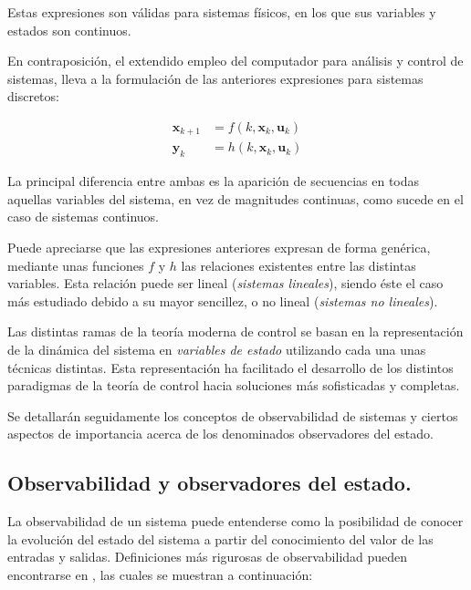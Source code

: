 Estas expresiones son válidas para sistemas físicos, en los que sus variables y estados son continuos. \par 

En contraposición, el extendido empleo del computador para análisis y control de sistemas, lleva a la formulación de las anteriores expresiones para sistemas discretos: 

\begin{subequations}
\begin{align}
	\boldsymbol{x}_{k+1} &= f(k,\boldsymbol{x}_k,\boldsymbol{u}_k) \\
	\boldsymbol{y}_k &= h(k,\boldsymbol{x}_k,\boldsymbol{u}_k)
\end{align}
\end{subequations}

La principal diferencia entre ambas es la aparición de secuencias en todas aquellas variables del sistema, en vez de magnitudes continuas, como sucede en el caso de sistemas continuos. \par 

Puede apreciarse que las expresiones anteriores expresan de forma genérica, mediante unas funciones $f$ y $h$ las relaciones existentes entre las distintas variables. Esta relación puede ser lineal (\emph{sistemas lineales}), siendo éste el caso más estudiado debido a su mayor sencillez, o no lineal (\emph{sistemas no lineales}). \par 

Las distintas ramas de la teoría moderna de control se basan en la representación de la dinámica del sistema en \emph{variables de estado} utilizando cada una unas técnicas distintas. Esta representación ha facilitado el desarrollo de los distintos paradigmas de la teoría de control hacia soluciones más sofisticadas y completas. \par 

Se detallarán seguidamente los conceptos de observabilidad de sistemas y ciertos aspectos de importancia acerca de los denominados observadores del estado.

\subsection{Observabilidad y observadores del estado.}

La observabilidad de un sistema puede entenderse como la posibilidad de conocer la evolución del estado del sistema a partir del conocimiento del valor de las entradas y salidas. Definiciones más rigurosas de observabilidad pueden encontrarse en \cite{dominguez2000control}, las cuales se muestran a continuación:

